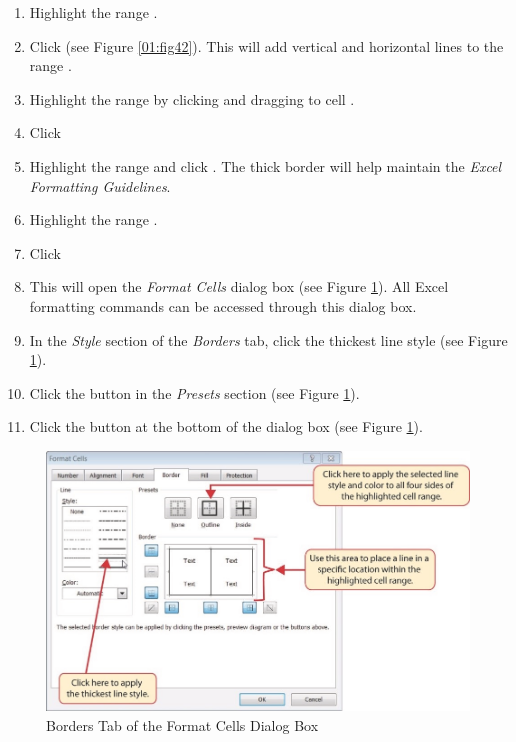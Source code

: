 \begin{enumerate}[resume]
	\item Highlight the range . 
	\item Click  (see Figure \ref{01:fig42}). This will add vertical and horizontal lines to the range .
	\item Highlight the range  by clicking  and dragging to cell .
	\item Click 
	\item Highlight the range  and click . The thick border will help maintain the \textit{Excel Formatting Guidelines}.
	\item Highlight the range .
	\item Click 
	\item This will open the \textit{Format Cells} dialog box (see Figure \ref{01:fig43}). All Excel formatting commands can be accessed through this dialog box.
	\item In the \textit{Style} section of the \textit{Borders} tab, click the thickest line style (see Figure \ref{01:fig43}).
	\item Click the  button in the \textit{Presets} section (see Figure \ref{01:fig43}).
	\item Click the  button at the bottom of the dialog box (see Figure \ref{01:fig43}).
\end{enumerate}

\begin{figure}[H]
	\centering
	\includegraphics[width=\maxwidth{.95\linewidth}]{gfx/ch01_fig43}
	\caption{Borders Tab of the Format Cells Dialog Box}
	\label{01:fig43}
\end{figure}


